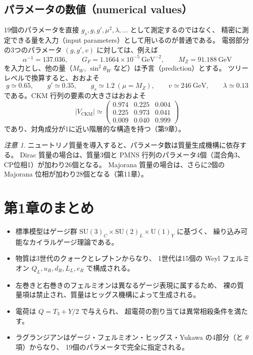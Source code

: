 \documentclass[uplatex,dvipdfmx,a4paper,11pt,openany]{jsbook}
\newcommand{\en}[1]{（#1）}
\numberwithin{equation}{chapter}
\theoremstyle{definition}
\theoremstyle{plain}
\theoremstyle{remark}
\newtheorem{remark}{注意}[chapter]
\newcommand{\SU}{\mathrm{SU}}
\newcommand{\U}{\mathrm{U}}
\begin{document}
\subsection{パラメータの数値（numerical values）}
19個のパラメータを直接 $g_s,g,g',\mu^2,\lambda,\ldots$ として測定するのではなく、
精密に測定できる量を入力\en{input parameters}として用いるのが普通である。
電弱部分の3つのパラメータ $(g,g',v)$ に対しては、例えば
\begin{equation}
\alpha^{-1}=137.036,\qquad
G_F=1.1664\times10^{-5}\ \mathrm{GeV}^{-2},\qquad
M_Z=91.188\ \mathrm{GeV}
\end{equation}
を入力とし、他の量（$M_W$, $\sin^2\theta_W$ など）は予言\en{prediction}とする。
ツリーレベルで換算すると、おおよそ
\begin{equation}
g\simeq0.65,\qquad g'\simeq0.35,\qquad g_s\simeq1.2\ (\mu=M_Z),\qquad
v\simeq246\ \mathrm{GeV},\qquad \lambda\simeq0.13
\end{equation}
である。CKM 行列の要素の大きさはおおよそ
\begin{equation}
|V_{\mathrm{CKM}}|\simeq
\begin{pmatrix}
0.974&0.225&0.004\\
0.225&0.973&0.041\\
0.009&0.040&0.999
\end{pmatrix}
\end{equation}
であり、対角成分が1に近い階層的な構造を持つ（第9章）。
\begin{remark}
ニュートリノ質量を導入すると、パラメータ数は質量生成機構に依存する。
Dirac 質量の場合は、質量3個と PMNS 行列のパラメータ4個（混合角3、CP位相1）が加わり26個となる。
Majorana 質量の場合は、さらに2個の Majorana 位相が加わり28個となる（第11章）。
\end{remark}
\section*{第1章のまとめ}
\begin{itemize}
    \item 標準模型はゲージ群 $\SU(3)_C\times\SU(2)_L\times\U(1)_Y$ に基づく、
    繰り込み可能なカイラルゲージ理論である。
    \item 物質は3世代のクォークとレプトンからなり、
    1世代は15個の Weyl フェルミオン
    $Q_L,u_R,d_R,L_L,e_R$ で構成される。
    \item 左巻きと右巻きのフェルミオンは異なるゲージ表現に属するため、
    裸の質量項は禁止され、質量はヒッグス機構によって生成される。
    \item 電荷は $Q=T_3+Y/2$ で与えられ、
    超電荷の割り当ては異常相殺条件を満たす。
    \item ラグランジアンはゲージ・フェルミオン・ヒッグス・Yukawa の4部分（と $\theta$ 項）からなり、
    19個のパラメータで完全に指定される。
\end{itemize}
\end{document}
